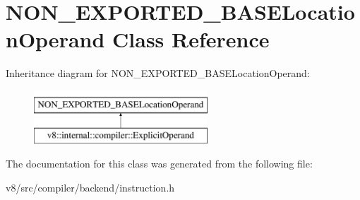 \hypertarget{classNON__EXPORTED__BASELocationOperand}{}\section{N\+O\+N\+\_\+\+E\+X\+P\+O\+R\+T\+E\+D\+\_\+\+B\+A\+S\+E\+Location\+Operand Class Reference}
\label{classNON__EXPORTED__BASELocationOperand}
Inheritance diagram for N\+O\+N\+\_\+\+E\+X\+P\+O\+R\+T\+E\+D\+\_\+\+B\+A\+S\+E\+Location\+Operand\+:\begin{figure}[H]
\begin{center}
\leavevmode
\includegraphics[height=2.000000cm]{classNON__EXPORTED__BASELocationOperand}
\end{center}
\end{figure}


The documentation for this class was generated from the following file\+:\begin{DoxyCompactItemize}
\item 
v8/src/compiler/backend/instruction.\+h\end{DoxyCompactItemize}
